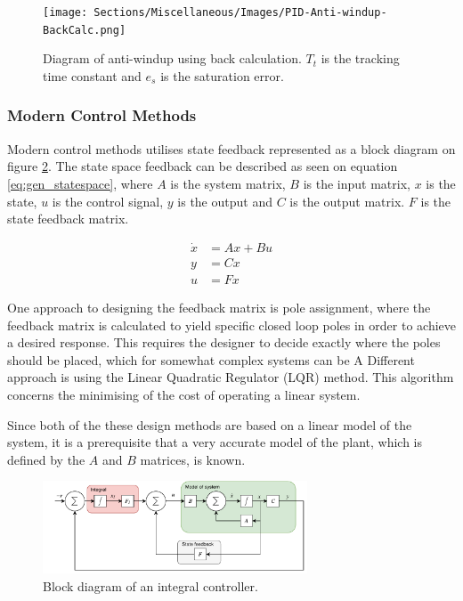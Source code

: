 \documentclass[../../main.tex]{subfiles}
\begin{document}
\begin{figure}
    \centering
    \texttt{[image: Sections/Miscellaneous/Images/PID-Anti-windup-BackCalc.png]}
    \caption{Diagram of anti-windup using back calculation. $T_t$ is the tracking time constant and $e_s$ is the saturation error.}
    \label{fig:anti-windup}
\end{figure}

\subsubsection*{Modern Control Methods}
Modern control methods utilises state feedback represented as a block diagram on figure \ref{fig:Integral_Diagram}. The state space feedback can be described as seen on equation \ref{eq:gen_statespace}, where $A$ is the system matrix, $B$ is the input matrix, $x$ is the state, $u$ is the control signal, $y$ is the output and $C$ is the output matrix. $F$ is the state feedback matrix. 

\begin{equation}\label{eq:gen_statespace}
    \begin{split}
        \Dot{x}&=Ax+Bu \\
        y&=Cx \\
        u&=Fx
    \end{split}
\end{equation}

One approach to designing the feedback matrix is pole assignment, where the feedback matrix is calculated to yield specific closed loop poles in order to achieve a desired response. This requires the designer to decide exactly where the poles should be placed, which for somewhat complex systems can be 
A Different approach is using the Linear Quadratic Regulator (LQR) method. This algorithm concerns the minimising of the cost of operating a linear system. 

Since both of the these design methods are based on a linear model of the system, it is a prerequisite that a very accurate model of the plant, which is defined by the $A$ and $B$ matrices, is known. 

\begin{figure}
    \centering
    \includegraphics[width=0.7\textwidth]{Sections/Miscellaneous/Images/Statefeedback_Integral.pdf}
    \caption{Block diagram of an integral controller.}
    \label{fig:Integral_Diagram}
\end{figure}
\end{document}
